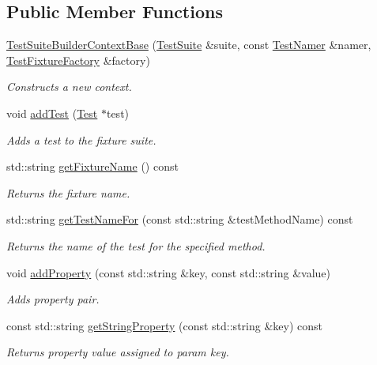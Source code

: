 \subsection*{Public Member Functions}
\begin{DoxyCompactItemize}
\item 
\hyperlink{class_test_suite_builder_context_base_a434b04354f7e326c7f88d015921d5e6d}{Test\+Suite\+Builder\+Context\+Base} (\hyperlink{class_test_suite}{Test\+Suite} \&suite, const \hyperlink{class_test_namer}{Test\+Namer} \&namer, \hyperlink{class_test_fixture_factory}{Test\+Fixture\+Factory} \&factory)
\begin{DoxyCompactList}\small\item\em Constructs a new context. \end{DoxyCompactList}\item 
void \hyperlink{class_test_suite_builder_context_base_a8b42185139e3efe07a0fe69b9549e928}{add\+Test} (\hyperlink{class_test}{Test} $\ast$test)
\begin{DoxyCompactList}\small\item\em Adds a test to the fixture suite. \end{DoxyCompactList}\item 
std\+::string \hyperlink{class_test_suite_builder_context_base_abba530361ccd63ddf23fcbdc4f33727f}{get\+Fixture\+Name} () const 
\begin{DoxyCompactList}\small\item\em Returns the fixture name. \end{DoxyCompactList}\item 
std\+::string \hyperlink{class_test_suite_builder_context_base_a137a255602edbdc2e1dc575fb53fee9e}{get\+Test\+Name\+For} (const std\+::string \&test\+Method\+Name) const 
\begin{DoxyCompactList}\small\item\em Returns the name of the test for the specified method. \end{DoxyCompactList}\item 
void \hyperlink{class_test_suite_builder_context_base_a358c75376f4d3df2ef570003cbe2e06a}{add\+Property} (const std\+::string \&key, const std\+::string \&value)
\begin{DoxyCompactList}\small\item\em Adds property pair. \end{DoxyCompactList}\item 
const std\+::string \hyperlink{class_test_suite_builder_context_base_a9955d3fda5115963ee0310d09a3b15d9}{get\+String\+Property} (const std\+::string \&key) const 
\begin{DoxyCompactList}\small\item\em Returns property value assigned to param key. \end{DoxyCompactList}\end{DoxyCompactItemize}
